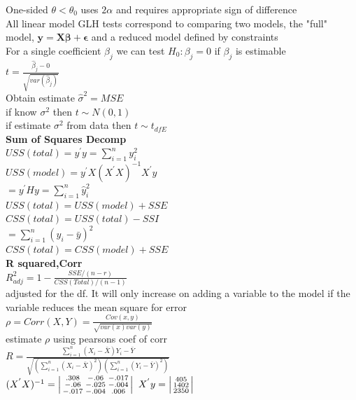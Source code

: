 \documentclass[10pt,landscape]{article}
\newenvironment{lsmallmatrix}
{\left|\begin{smallmatrix}}
	{\end{smallmatrix}\right|}
\newcommand{\B}{\beta}
\newcommand{\sg}{\sigma}
\newcommand{\hb}{\hat{\beta}}
\newcommand{\sumn}{\sum_{i=1}^{n}}
\newcommand{\ta}{\theta}
\begin{document}
\begin{multicols*}{4}
One-sided $\ta<\ta_0$ uses $2\alpha$ and requires appropriate sign of difference\\
All linear model GLH tests correspond to comparing two models, the "full" model, $\bm{y}=\bm{X\B}+\bm{\epsilon}$ and a reduced model defined by constraints\\
For a single coefficient $\B_j$ we can test $H_0:\B_j=0$ if $\B_j$ is estimable\\
$t=\frac{\hb_j-0}{\sqrt{var(\hb_j)}}$\\
Obtain estimate $\hat{\sg}^2=MSE$\\
if know $\sigma^2$  then $t\sim N(0,1)$\\
if estimate $\sg^2$ from data then $t\sim t_{dfE}$\\
\textbf{Sum of Squares Decomp}\\
$USS(total)=y^{'}y=\sumn y_i^2$\\
$USS(model)=y^{'}X(X^{'}X)^{-1}X^{'}y$\\
$=y^{'}Hy=\sumn \hat{y}_i^2$\\
$USS(total)=USS(model)+SSE$\\
$CSS(total)=USS(total)-SSI$\\
$=\sumn(y_i-\bar{y})^2$\\
$CSS(total)=CSS(model)+SSE$\\
\textbf{R squared,Corr}\\
$R^2_{adj}=1-\frac{SSE/(n-r)}{CSS(Total)/(n-1)}$\\
 adjusted for the df. It will only increase on
adding a variable to the model if the variable reduces the mean square
for error\\
$\rho=Corr(X,Y)=\frac{Cov(x,y)}{\sqrt{var(x)var(y)}}$\\
estimate $\rho$ using pearsons coef of corr\\
$R=\frac{\sumn(X_i-\bar{X})Y_i-\bar{Y}}{\sqrt{(\sumn
(X_i-\bar{X})^2)(\sumn (Y_i-\bar{Y})^2)}}$\\
$(X^{'}X)^{-1}=\begin{lsmallmatrix}
.308&-.06&-.017\\
-.06&-.025&-.004\\
-.017&-.004&.006
\end{lsmallmatrix}$ $X^{'}y=\begin{lsmallmatrix}
405\\1402\\2350
\end{lsmallmatrix}$\\
\end{multicols*}
\end{document}

